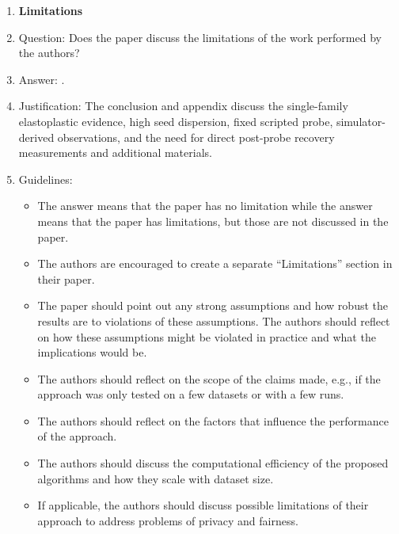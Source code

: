 \begin{enumerate}
\item {\bf Limitations}
    \item[] Question: Does the paper discuss the limitations of the work performed by the authors?
    \item[] Answer: \answerYes{}.
    \item[] Justification: The conclusion and appendix discuss the single-family elastoplastic evidence, high seed dispersion, fixed scripted probe, simulator-derived observations, and the need for direct post-probe recovery measurements and additional materials.
    \item[] Guidelines:
    \begin{itemize}
        \item The answer \answerNA{} means that the paper has no limitation while the answer \answerNo{} means that the paper has limitations, but those are not discussed in the paper.
        \item The authors are encouraged to create a separate ``Limitations'' section in their paper.
        \item The paper should point out any strong assumptions and how robust the results are to violations of these assumptions. The authors should reflect on how these assumptions might be violated in practice and what the implications would be.
        \item The authors should reflect on the scope of the claims made, e.g., if the approach was only tested on a few datasets or with a few runs.
        \item The authors should reflect on the factors that influence the performance of the approach.
        \item The authors should discuss the computational efficiency of the proposed algorithms and how they scale with dataset size.
        \item If applicable, the authors should discuss possible limitations of their approach to address problems of privacy and fairness.
    \end{itemize}


\end{enumerate}
